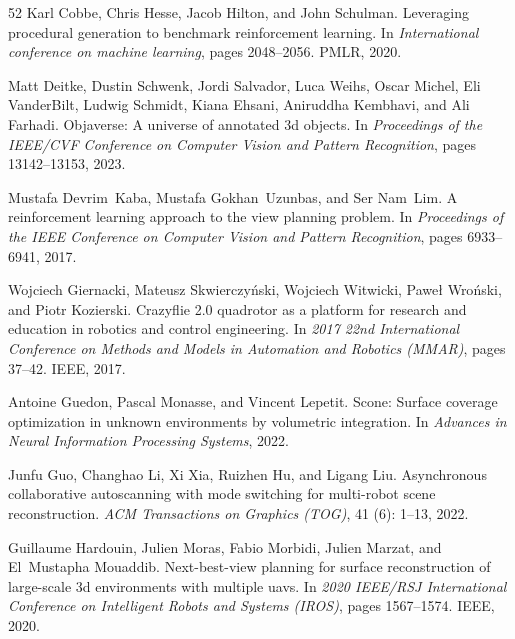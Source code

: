 \documentclass[10pt,twocolumn,letterpaper]{article}
\begin{document}
{\begin{thebibliography}{52}
Karl Cobbe, Chris Hesse, Jacob Hilton, and John Schulman.
\newblock Leveraging procedural generation to benchmark reinforcement learning.
\newblock In \emph{International conference on machine learning}, pages 2048--2056. PMLR, 2020.

Matt Deitke, Dustin Schwenk, Jordi Salvador, Luca Weihs, Oscar Michel, Eli VanderBilt, Ludwig Schmidt, Kiana Ehsani, Aniruddha Kembhavi, and Ali Farhadi.
\newblock Objaverse: A universe of annotated 3d objects.
\newblock In \emph{Proceedings of the IEEE/CVF Conference on Computer Vision and Pattern Recognition}, pages 13142--13153, 2023.

Mustafa Devrim~Kaba, Mustafa Gokhan~Uzunbas, and Ser Nam~Lim.
\newblock A reinforcement learning approach to the view planning problem.
\newblock In \emph{Proceedings of the IEEE Conference on Computer Vision and Pattern Recognition}, pages 6933--6941, 2017.

Wojciech Giernacki, Mateusz Skwierczy{\'n}ski, Wojciech Witwicki, Pawe{\l} Wro{\'n}ski, and Piotr Kozierski.
\newblock Crazyflie 2.0 quadrotor as a platform for research and education in robotics and control engineering.
\newblock In \emph{2017 22nd International Conference on Methods and Models in Automation and Robotics (MMAR)}, pages 37--42. IEEE, 2017.

Antoine Guedon, Pascal Monasse, and Vincent Lepetit.
\newblock Scone: Surface coverage optimization in unknown environments by volumetric integration.
\newblock In \emph{Advances in Neural Information Processing Systems}, 2022.

Junfu Guo, Changhao Li, Xi Xia, Ruizhen Hu, and Ligang Liu.
\newblock Asynchronous collaborative autoscanning with mode switching for multi-robot scene reconstruction.
\newblock \emph{ACM Transactions on Graphics (TOG)}, 41 (6): 1--13, 2022.

Guillaume Hardouin, Julien Moras, Fabio Morbidi, Julien Marzat, and El~Mustapha Mouaddib.
\newblock Next-best-view planning for surface reconstruction of large-scale 3d environments with multiple uavs.
\newblock In \emph{2020 IEEE/RSJ International Conference on Intelligent Robots and Systems (IROS)}, pages 1567--1574. IEEE, 2020.


\end{thebibliography}}
\end{document}
